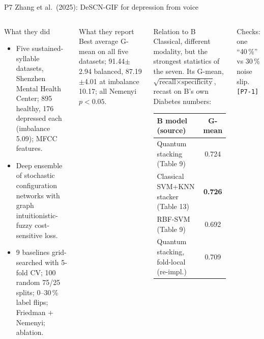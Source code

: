 \documentclass[aspectratio=169,10pt,t,xcolor={table}]{beamer}
\begin{document}
\begin{frame}{P7 \quad Zhang et al.\ (2025): DeSCN-GIF for depression from voice}
\begin{columns}[T]
\begin{block}{What they did}
\footnotesize
\begin{itemize}
  \item Five sustained-syllable datasets, Shenzhen Mental Health Center; 895 healthy, 176 depressed each (imbalance 5.09); MFCC features.
  \item Deep ensemble of stochastic configuration networks with graph intuitionistic-fuzzy cost-sensitive loss.
  \item 9 baselines grid-searched with 5-fold CV; 100 random 75/25 splits; 0--30\,\% label flips; Friedman + Nemenyi; ablation.
\end{itemize}
\end{block}
\begin{block}{What they report}
\footnotesize Best average G-mean on all five datasets; 91.44$\pm$2.94 balanced, 87.19$\pm$4.01 at imbalance 10.17; all Nemenyi $p<0.05$.
\end{block}
\begin{exampleblock}{Relation to B}
\footnotesize
Classical, different modality, but the strongest statistics of the seven. Its G-mean, $\sqrt{\text{recall}\times\text{specificity}}$, recast on B's own Diabetes numbers:
\par\smallskip\scriptsize
\begin{tabular}{lc}
\toprule
B model (source) & G-mean \\
\midrule
Quantum stacking (Table 9) & 0.724 \\
Classical SVM+KNN stacker (Table 13) & \textbf{0.726} \\
RBF-SVM (Table 9) & 0.692 \\
Quantum stacking, fold-local (re-impl.) & 0.709 \\
\bottomrule
\end{tabular}
\end{exampleblock}
\footnotesize Checks: one ``40\,\%'' vs 30\,\% noise slip. \texttt{[P7-1]}
\end{columns}
\end{frame}

\end{document}
